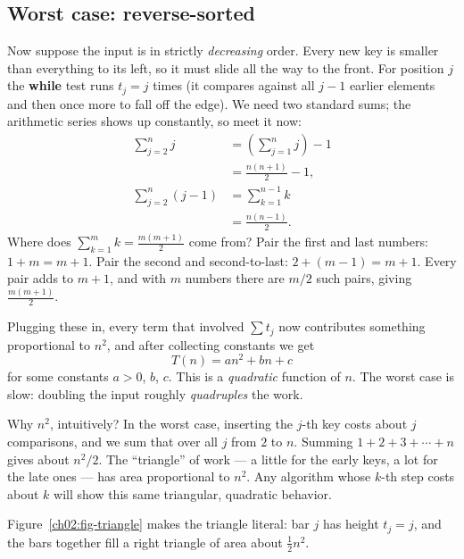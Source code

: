 \subsection{Worst case: reverse-sorted}

Now suppose the input is in strictly \emph{decreasing} order. Every new key is smaller
than everything to its left, so it must slide all the way to the front. For position
$j$ the \textbf{while} test runs $t_j = j$ times (it compares against all $j-1$ earlier
elements and then once more to fall off the edge). We need two standard sums; the
arithmetic series shows up constantly, so meet it now:
\begin{align*}
\sum_{j=2}^{n} j &= \left(\sum_{j=1}^{n} j\right) - 1 \\
                 &= \frac{n(n+1)}{2} - 1, \\[1ex]
\sum_{j=2}^{n} (j-1) &= \sum_{k=1}^{n-1} k \\
                     &= \frac{n(n-1)}{2}.
\end{align*}
Where does $\sum_{k=1}^m k = \frac{m(m+1)}{2}$ come from? Pair the first and last numbers:
$1 + m = m+1$. Pair the second and second-to-last: $2 + (m-1) = m+1$. Every pair adds to $m+1$,
and with $m$ numbers there are $m/2$ such pairs, giving $\frac{m(m+1)}{2}$.

Plugging these in, every term that involved $\sum t_j$ now contributes something
proportional to $n^2$, and after collecting constants we get
\[
T(n) = a n^2 + b n + c
\]
for some constants $a > 0$, $b$, $c$. This is a \emph{quadratic} function of $n$. The
worst case is slow: doubling the input roughly \emph{quadruples} the work.

\begin{intuitionbox}
Why $n^2$, intuitively? In the worst case, inserting the $j$-th key costs about $j$
comparisons, and we sum that over all $j$ from $2$ to $n$. Summing $1 + 2 + 3 + \cdots +
n$ gives about $n^2/2$. The ``triangle'' of work --- a little for the early keys, a lot
for the late ones --- has area proportional to $n^2$. Any algorithm whose $k$-th step
costs about $k$ will show this same triangular, quadratic behavior.
\end{intuitionbox}

Figure~\ref{ch02:fig-triangle} makes the triangle literal: bar $j$ has height $t_j = j$,
and the bars together fill a right triangle of area about $\tfrac12 n^2$.

